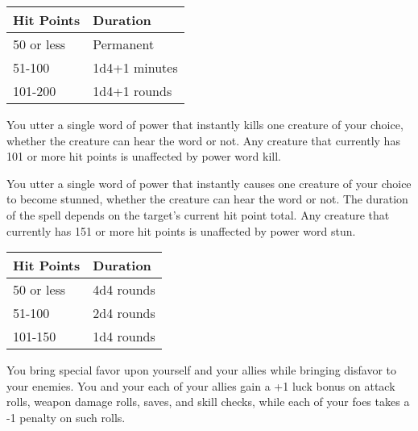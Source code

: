 \begin{multicols}{2}
\begin{small}
\begin{center}
\begin{tabular}[h!]{l|l}
Hit Points & Duration	\\ \hline
50 or less & Permanent \\
51-100 & 1d4+1 minutes \\
101-200 & 1d4+1 rounds \\
\end{tabular}
\end{center}

\noindent You utter a single word of power that instantly kills one creature of your choice, whether the creature can hear the word or not. Any creature that currently has 101 or more hit points is unaffected by power word kill.

\noindent You utter a single word of power that instantly causes one creature of your choice to become stunned, whether the creature can hear the word or not. The duration of the spell depends on the target's current hit point total. Any creature that currently has 151 or more hit points is unaffected by power word stun.

\begin{center}
\begin{tabular}[h!]{l|l}
Hit Points & Duration	\\ \hline
50 or less & 4d4 rounds \\
51-100 & 2d4 rounds	\\
101-150 & 1d4 rounds \\
\end{tabular}
\end{center}

\noindent You bring special favor upon yourself and your allies while bringing disfavor to your enemies. You and your each of your allies gain a +1 luck bonus on attack rolls, weapon damage rolls, saves, and skill checks, while each of your foes takes a -1 penalty on such rolls.


\end{small}
\end{multicols}
